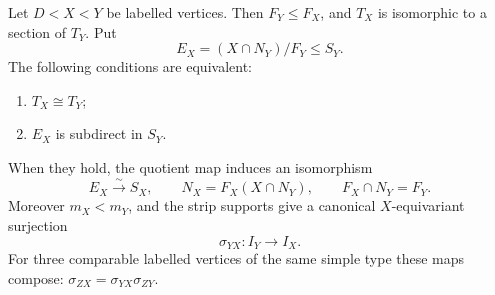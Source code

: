 \begin{proposition}
\label{frm:equal-transport}
Let $D<X<Y$ be labelled vertices. Then $F_Y\le F_X$, and $T_X$ is
isomorphic to a section of $T_Y$. Put
\[
 E_X=(X\cap N_Y)/F_Y\le S_Y.
\]
The following conditions are equivalent:
\begin{enumerate}[label=\textup{(\roman*)}]
 \item $T_X\cong T_Y$;
 \item $E_X$ is subdirect in $S_Y$.
\end{enumerate}
When they hold, the quotient map induces an isomorphism
\begin{equation}
 \label{frm:equal-socle-identification}
 E_X\xrightarrow{\ \sim\ }S_X,
 \qquad
 N_X=F_X(X\cap N_Y),
 \qquad F_X\cap N_Y=F_Y.
\end{equation}
Moreover $m_X<m_Y$, and the strip supports give a canonical
$X$-equivariant surjection
\begin{equation}
 \label{frm:equal-support-map}
 \sigma_{YX}:I_Y\longrightarrow I_X.
\end{equation}
For three comparable labelled vertices of the same simple type these
maps compose:
$\sigma_{ZX}=\sigma_{YX}\sigma_{ZY}$.
\end{proposition}

